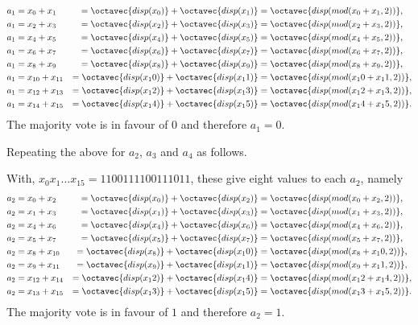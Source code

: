 \begin{enumerate}[label=(\roman*)]
\begin{alignat*}{4}
	a_1 &= x_0 + x_1
	&= \octavec{disp(x_0)}+ \octavec{disp(x_1)} &= \octavec{disp(mod(x_0+x_1,2))},\\
	a_1 &= x_2 + x_3
	&= \octavec{disp(x_2)}+ \octavec{disp(x_3)} &= \octavec{disp(mod(x_2+x_3,2))},\\
	a_1 &= x_4 + x_5
	&= \octavec{disp(x_4)}+ \octavec{disp(x_5)} &= \octavec{disp(mod(x_4+x_5,2))},\\
	a_1 &= x_6 + x_7
	&= \octavec{disp(x_6)}+ \octavec{disp(x_7)} &= \octavec{disp(mod(x_6+x_7,2))},\\
	a_1 &= x_8 + x_9
	&= \octavec{disp(x_8)}+ \octavec{disp(x_9)} &= \octavec{disp(mod(x_8+x_9,2))},\\
	a_1 &= x_{10} + x_{11}
	&= \octavec{disp(x_10)}+ \octavec{disp(x_11)} &= \octavec{disp(mod(x_10+x_11,2))},\\
	a_1 &= x_{12} + x_{13}
	&= \octavec{disp(x_12)}+ \octavec{disp(x_13)} &= \octavec{disp(mod(x_12+x_13,2))},\\
	a_1 &= x_{14} + x_{15}
	&= \octavec{disp(x_14)}+ \octavec{disp(x_15)} &= \octavec{disp(mod(x_14+x_15,2))}.
\end{alignat*}
The majority vote is in favour of $0$ and therefore $a_1 = 0$.  

Repeating the above for $a_2$, $a_3$ and $a_4$ as follows.

With, $x_0x_1\ldots x_{15}=1100111100111011$, these give eight values to each $a_2$, namely
\begin{alignat*}{4}
	a_2 &= x_0 + x_2
	&= \octavec{disp(x_0)}+ \octavec{disp(x_2)} &= \octavec{disp(mod(x_0+x_2,2))},\\
	a_2 &= x_1 + x_3
	&= \octavec{disp(x_1)}+ \octavec{disp(x_3)} &= \octavec{disp(mod(x_1+x_3,2))},\\
	a_2 &= x_4 + x_6
	&= \octavec{disp(x_4)}+ \octavec{disp(x_6)} &= \octavec{disp(mod(x_4+x_6,2))},\\
	a_2 &= x_5 + x_7
	&= \octavec{disp(x_5)}+ \octavec{disp(x_7)} &= \octavec{disp(mod(x_5+x_7,2))},\\
	a_2 &= x_8 + x_{10}
	&= \octavec{disp(x_8)}+ \octavec{disp(x_10)} &= \octavec{disp(mod(x_8+x_10,2))},\\
	a_2 &= x_{9} + x_{11}
	&= \octavec{disp(x_9)}+ \octavec{disp(x_11)} &= \octavec{disp(mod(x_9+x_11,2))},\\
	a_2 &= x_{12} + x_{14}
	&= \octavec{disp(x_12)}+ \octavec{disp(x_14)} &= \octavec{disp(mod(x_12+x_14,2))},\\
	a_2 &= x_{13} + x_{15}
	&= \octavec{disp(x_13)}+ \octavec{disp(x_15)} &= \octavec{disp(mod(x_13+x_15,2))}.
\end{alignat*}
The majority vote is in favour of $1$ and therefore $a_2 = 1$.


\end{enumerate}
